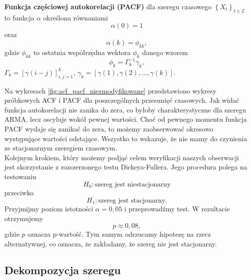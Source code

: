 \documentclass[11pt]{article}
\begin{document}
\begin{definition}
\textbf{Funkcja częściowej autokorelacji (PACF)} dla szeregu czasowego ${\left\lbrace X_t \right\rbrace}_{t \in \mathbb{Z}}$ to funkcja $\alpha$ określona równaniami 
$$ \alpha\left(0\right) = 1$$ 
oraz 
$$ \alpha\left(k\right) = \phi_{kk}, $$
gdzie $\phi_{kk}$ to ostatnia współrzędna wektora $\phi_k$ danego wzorem 
$$ \phi_k = \Gamma_k^{-1}\gamma_k, $$
$ \Gamma_k = \left[\gamma\left(i - j\right)\right]_{i,j = 1}^k $, $\gamma_k = \left[\gamma\left(1\right), \gamma\left(2\right), \ldots, \gamma\left(k\right)\right]$.
\end{definition}

Na wykresach \ref{fig:acf_pacf_niezmodyfikowane} przedstawiono wykresy próbkowych ACF i PACF dla poszczególnych przesunięć czasowych. Jak widać funkcja autokorelacji nie zanika do zera, co byłoby charakterystyczne dla szeregu ARMA, lecz oscyluje wokół pewnej wartości. Choć od pewnego momentu funkcja PACF wydaje się zanikać do zera, to możemy zaobserwować okresowo występujące wartości odstające. Wszystko to wskazuje, że nie mamy do czynienia ze stacjonarnym szeregiem czasowym. \\ 

Kolejnym krokiem, który możemy podjąć celem weryfikacji naszych obserwacji jest skorzystanie z rozszerzonego testu Dickeya-Fullera. Jego procedura polega na testowaniu 
$$ H_0: \text{szereg jest niestacjonarny} $$
przeciwko 
$$ H_1: \text{szereg jest stacjonarny}. $$
Przyjmijmy poziom istotności $\alpha = 0,05$ i przeprowadźmy test. W rezultacie otrzymujemy 
$$ p \approx 0,08, $$
gdzie $p$ oznacza p-wartość. Tym samym odrzucamy hipotezę na rzecz alternatywnej, co oznacza, że zakładamy, że szereg nie jest stacjonarny. \\ 

\subsection{Dekompozycja szeregu}
\end{document}
